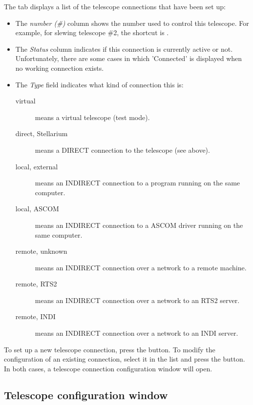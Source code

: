 \noindent The  tab displays a list of the telescope connections that have been set up:

\begin{itemize}
\item The \emph{number (\#)} column shows the number used to control this
  telescope. For example, for slewing telescope \#2, the shortcut is
  .
\item The \emph{Status} column indicates if this connection is
  currently active or not. Unfortunately, there are some cases in
  which 'Connected' is displayed when no working connection exists.
\item The \emph{Type} field indicates what kind of connection this is:
  \begin{description}
  \item[virtual] means a virtual telescope (test mode).
  \item[direct, Stellarium] means a DIRECT connection to the telescope (see above).
  \item[local, external] means an INDIRECT connection to a program running on the same computer.
  \item[local, ASCOM] means an INDIRECT connection to a ASCOM driver running on the same computer.
  \item[remote, unknown] means an INDIRECT connection over a network to a remote machine.
  \item[remote, RTS2] means an INDIRECT connection over a network to an RTS2 server.
  \item[remote, INDI] means an INDIRECT connection over a network to an INDI server.
  \end{description}
\end{itemize}

\noindent To set up a new telescope connection, press the  button. To modify
the configuration of an existing connection, select it in the list and
press the  button. In both cases, a telescope connection
configuration window will open.



\subsection{Telescope configuration window}

